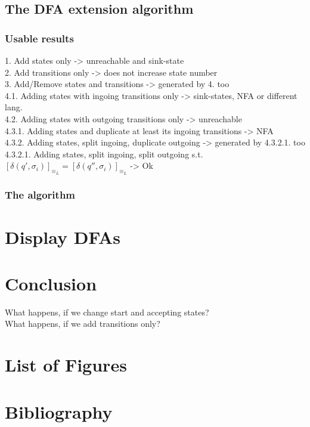 \documentclass[a4paper, oneside, 11pt]{report}
\theoremstyle{definition}
\theoremstyle{remark}
\begin{document}
\section{The DFA extension algorithm}

\subsection{Usable results}

1. Add states only -> unreachable and sink-state \\
2. Add transitions only -> does not increase state number \\
3. Add/Remove states and transitions -> generated by 4. too \\
4.1. Adding states with ingoing transitions only -> sink-states, NFA or different lang. \\
4.2. Adding states with outgoing transitions only -> unreachable \\
4.3.1. Adding states and duplicate at least its ingoing transitions -> NFA \\
4.3.2. Adding states, split ingoing, duplicate outgoing -> generated by 4.3.2.1. too \\
4.3.2.1. Adding states, split ingoing, split outgoing s.t. $[\delta(q', \sigma_i)]_{\equiv_L} = [\delta(q'', \sigma_i)]_{\equiv_L}$ -> Ok


\subsection{The algorithm}




\chapter{Display DFAs}




\chapter{Conclusion}

What happens, if we change start and accepting states? \\
What happens, if we add transitions only?


\appendix
\chapter{List of Figures}
\chapter{Bibliography}
\end{document}
